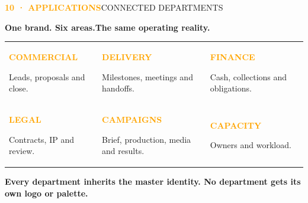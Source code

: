 \documentclass[a4paper,10pt]{article}
\newcommand{\PageLabel}[2]{\noindent\textcolor{orange}{\footnotesize\bfseries #1}\hfill\textcolor{ink!55}{\footnotesize #2}\par\vspace{5mm}}
\newcommand{\Title}[1]{{\displayfont\bfseries\fontsize{34}{38}\selectfont\color{ink}#1\par}}
\begin{document}
\PageLabel{10 · APPLICATIONS}{CONNECTED DEPARTMENTS}
\Title{One brand. Six areas.\newline The same operating reality.}
\vspace{6mm}
\begin{tabularx}{\textwidth}{@{}Y Y Y@{}}
\begin{card}\textcolor{orange}{\bfseries COMMERCIAL}\par\small Leads, proposals and close.\end{card}&
\begin{card}\textcolor{orange}{\bfseries DELIVERY}\par\small Milestones, meetings and handoffs.\end{card}&
\begin{card}\textcolor{orange}{\bfseries FINANCE}\par\small Cash, collections and obligations.\end{card}\\[4mm]
\begin{card}\textcolor{orange}{\bfseries LEGAL}\par\small Contracts, IP and review.\end{card}&
\begin{card}\textcolor{orange}{\bfseries CAMPAIGNS}\par\small Brief, production, media and results.\end{card}&
\begin{card}\textcolor{orange}{\bfseries CAPACITY}\par\small Owners and workload.\end{card}
\end{tabularx}
\vspace{8mm}\begin{card}[colback=ink,colframe=ink]\color{white}\displayfont\bfseries\large Every department inherits the master identity. No department gets its own logo or palette.\end{card}
\vfill\newpage
\end{document}
